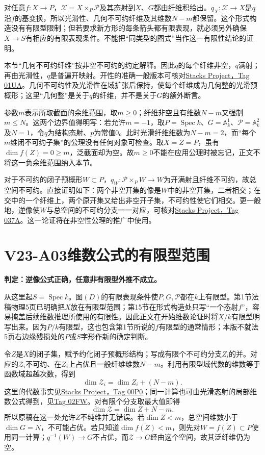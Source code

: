 \documentclass[UTF8,a4paper]{ctexbook}
\DeclareMathOperator{\Spec}{Spec}
\newcommand{\audit}[3]{\Needspace{5\baselineskip}\hypertarget{audit:#1}{}\section*{#1\quad #2}\addcontentsline{toc}{section}{#1\quad #2}\noindent\textbf{判定：#3。}\par\smallskip}
\begin{document}
对任意$f:X\to P$，$\mathcal X=X\times_P\mathcal P$及其态射到$X$、$G$都由纤维积给出。$q_X:\mathcal X\to X$是$q$沿$f$的基变换，所以光滑性、几何不可约纤维及其维数$N-m$都保留。这个形式构造没有有限型限制；但若要求新方形的每条箭头都有限表现，就必须另外确保$X\to S$有相应的有限表现条件。不能把“同类型的图式”当作这一有限性结论的证明。

本节“几何不可约纤维”按非空不可约的约定解释。因此$q$的每个纤维非空，$q$满射；再由光滑性，$q$是普遍开映射。开性的准确一般版本可核对\href{https://stacks.math.columbia.edu/tag/01UA}{Stacks Project，Tag 01UA}。几何不可约性及光滑性在域扩张后保持，使每个纤维成为几何整的光滑预概形；这里“几何整”是关于$q$的纤维，并不是关于$G$的额外断言。

参数$m$表示所取截面的余维范围，取$m\geq0$；纤维非空且有维数$N-m$又强制$m\leq N$。这两个边界值得明写：若允许$m=-1$，取$P=\Spec k$、$G=\mathbb A^1_k$、$\mathcal P=\mathbb A^2_k$及$N=1$，令$q$为结构态射、$p$为常值$0$。此时光滑纤维维数为$N-m=2$，而“每个$m$维闭不可约子集”的公理没有任何对象可检查。取$X=Z=P$，虽有$\dim f(Z)=0\geq m$，泛截面却为空。故$m\geq0$不能在应用公理时被忘记，正文不将这一负余维范围纳入本节。

对于不可约的闭子预概形$W\subset P$，$q_W:\mathcal P\times_PW\to W$为开满射且纤维不可约，故总空间不可约。直接证明如下：两个非空开集的像是$W$中的非空开集，二者相交；在交中的一个纤维上，两个原开集又给出非空开子集，不可约性使它们相交。更一般地，逆像使$W$与总空间的不可约分支一一对应，可核对\href{https://stacks.math.columbia.edu/tag/037A}{Stacks Project，Tag 037A}。这一论证将在非空性公理的推广中使用。

\audit{V23-A03}{维数公式的有限型范围}{逆像公式正确，任意非有限型外推不成立}
从这里起$S=\Spec k$。图$(D)$的有限表现条件使$P,G,\mathcal P$都在$k$上有限型。第1节法稿物理5页已明确把$X$放在有限型范围；第15节在形式构造处只写“一个态射$f$”，容易掩盖后续维数推理所使用的有限性。因此正文在开始维数论证时将$X/k$有限型明写出来。因为$P/k$有限型，这也包含第1节所说的$f$有限型的通常情形；本版不就法5页右边缘残损处的$P$或$S$字形作新的确定判断。

令$Z$是$X$的闭子集，赋予约化闭子预概形结构；写成有限个不可约分支$Z_i$的并。对应的$\mathcal Z_i$不可约、在$Z_i$上占优且一般纤维维数$N-m$。利用有限型域代数的维数等于函数域超越次数，得到
\[
\dim\mathcal Z_i
 =\dim Z_i+(N-m).
\]
这里的代数事实见\href{https://stacks.math.columbia.edu/tag/00P0}{Stacks Project，Tag 00P0}；同一计算也可由光滑态射的局部维数公式得到，见\href{https://stacks.math.columbia.edu/tag/02FW}{Tag 02FW}。对有限个分支取最大值即得
\[
\dim\mathcal Z=\dim Z+N-m.
\]
所以原稿在这一处允许$Z$不纯维并无错误。若$\dim Z<m$，总空间维数小于$\dim G=N$，不可能占优。若只知道$\dim\overline{f(Z)}<m$，则先对$W=\overline{f(Z)}\subset P$使用同一计算；$q^{-1}(W)\to G$不占优，而$\mathcal Z\to G$经由这个空间，故其泛纤维仍为空。
\end{document}
